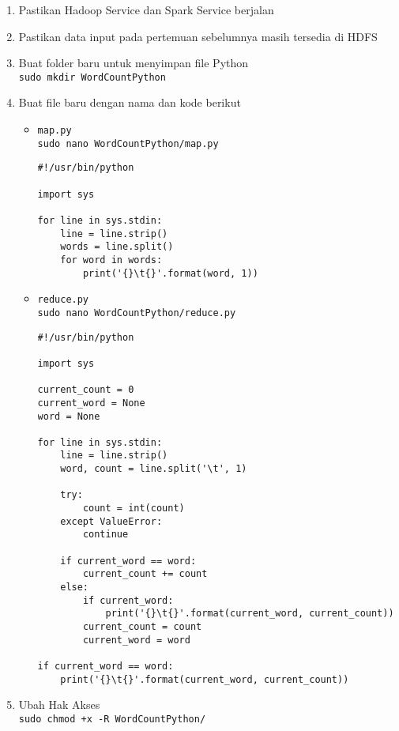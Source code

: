 \documentclass[a4paper]{tufte-handout}
\begin{document}
\begin{enumerate}
\item Pastikan Hadoop Service dan Spark Service berjalan
\item Pastikan data input pada pertemuan sebelumnya masih tersedia di HDFS
\item Buat folder baru untuk menyimpan file Python \\
{\tt sudo mkdir WordCountPython} 

\item Buat file baru dengan nama dan kode berikut
\begin{itemize}
\item {\tt map.py} \\
{\tt sudo nano WordCountPython/map.py}
\begin{lstlisting}
#!/usr/bin/python

import sys

for line in sys.stdin:
    line = line.strip()
    words = line.split()
    for word in words:
        print('{}\t{}'.format(word, 1))
\end{lstlisting}

\item {\tt reduce.py} \\
{\tt sudo nano WordCountPython/reduce.py}
\begin{lstlisting}
#!/usr/bin/python

import sys

current_count = 0
current_word = None
word = None

for line in sys.stdin:
    line = line.strip()
    word, count = line.split('\t', 1)

    try:
        count = int(count)
    except ValueError:
        continue

    if current_word == word:
        current_count += count
    else:
        if current_word:
            print('{}\t{}'.format(current_word, current_count))
        current_count = count
        current_word = word        

if current_word == word:
    print('{}\t{}'.format(current_word, current_count))
\end{lstlisting}
\end{itemize}

\item Ubah Hak Akses \\
{\tt sudo chmod +x -R WordCountPython/} 


\end{enumerate}
\end{document}
